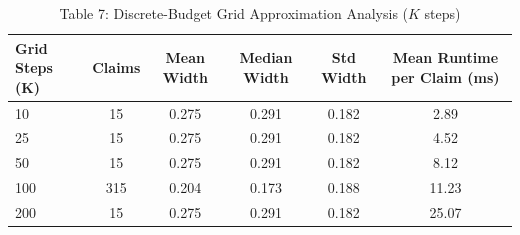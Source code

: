 \begin{table}[htbp]
\centering
\caption{Table 7: Discrete-Budget Grid Approximation Analysis ($K$ steps)}
\label{tab:table7_grid_resolution}
\begin{tabular}{lccccc}
\hline
Grid Steps (K) & Claims & Mean Width & Median Width & Std Width & Mean Runtime per Claim (ms) \\
\hline
10 & 15 & 0.275 & 0.291 & 0.182 & 2.89 \\
25 & 15 & 0.275 & 0.291 & 0.182 & 4.52 \\
50 & 15 & 0.275 & 0.291 & 0.182 & 8.12 \\
100 & 315 & 0.204 & 0.173 & 0.188 & 11.23 \\
200 & 15 & 0.275 & 0.291 & 0.182 & 25.07 \\
\hline
\end{tabular}
\end{table}